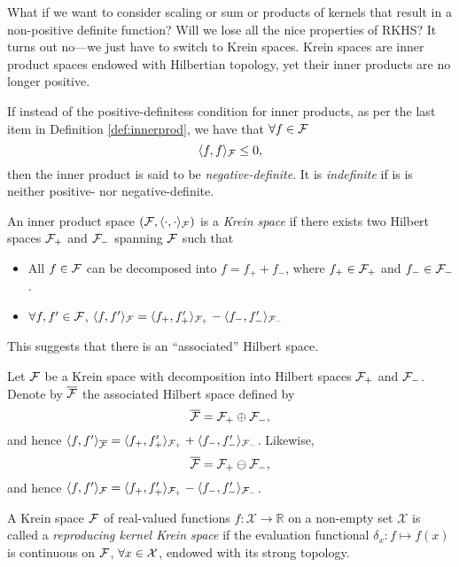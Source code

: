 What if we want to consider scaling or sum or products of kernels that result in a non-positive definite function?
Will we lose all the nice properties of RKHS?
It turns out no---we just have to switch to Krein spaces.
Krein spaces are inner product spaces endowed with Hilbertian topology, yet their inner products are no longer positive.

\begin{definition}
  If instead of the positive-definitess condition for inner products, as per the last item in Definition \ref{def:innerprod}, we have that $\forall f\in{\mathcal F}$
  \[
    \langle f,f\rangle_{\mathcal F} \leq 0,
  \]
  then the inner product is said to be \emph{negative-definite}.
  It is \emph{indefinite} if is is neither positive- nor negative-definite.
\end{definition}


\begin{definition}
  An inner product space $({\mathcal F},\langle\cdot,\cdot\rangle_{\mathcal F})$ is a \emph{Krein space} if there exists two Hilbert spaces ${\mathcal F}_+$ and ${\mathcal F}_-$ spanning ${\mathcal F}$ such that
  \begin{itemize}
    \item All $f\in{\mathcal F}$ can be decomposed into $f = f_+ + f_-$, where $f_+\in{\mathcal F}_+$ and $f_- \in {\mathcal F}_-$.
    \item $\forall f,f'\in{\mathcal F}$, $\langle f,f'\rangle_{\mathcal F} = \langle f_+,f_+'\rangle_{{\mathcal F}_+}- \langle f_-,f_-'\rangle_{{\mathcal F}_-}$
  \end{itemize}
\end{definition}

This suggests that there is an ``associated'' Hilbert space.

\begin{definition}
  Let ${\mathcal F}$ be a Krein space with decomposition into Hilbert spaces ${\mathcal F}_+$ and ${\mathcal F}_-$.
  Denote by $\overline {{\mathcal F}}$ the associated Hilbert space defined by
  \[
    \overline {{\mathcal F}} = {\mathcal F}_+ \oplus {\mathcal F}_-,
  \]
  and hence $\langle f,f'\rangle_{\overline{{\mathcal F}}} = \langle f_+,f_+'\rangle_{{\mathcal F}_+} + \langle f_-,f_-'\rangle_{{\mathcal F}_-}$.
  Likewise,
  \[
    \overline {{\mathcal F}} = {\mathcal F}_+ \ominus {\mathcal F}_-,
  \]
  and hence $\langle f,f'\rangle_{{\mathcal F}} = \langle f_+,f_+'\rangle_{{\mathcal F}_+} - \langle f_-,f_-'\rangle_{{\mathcal F}_-}$.
\end{definition}

\begin{definition}
  A Krein space ${\mathcal F}$ of real-valued functions $f:\mathcal X \rightarrow \mathbb R$ on a non-empty set $\mathcal X$ is called a \emph{reproducing kernel Krein space} if the evaluation functional $\delta_x: f \mapsto f(x)$ is continuous on ${\mathcal F}$, $\forall x \in {\mathcal X}$, endowed with its strong topology. 
\end{definition}

